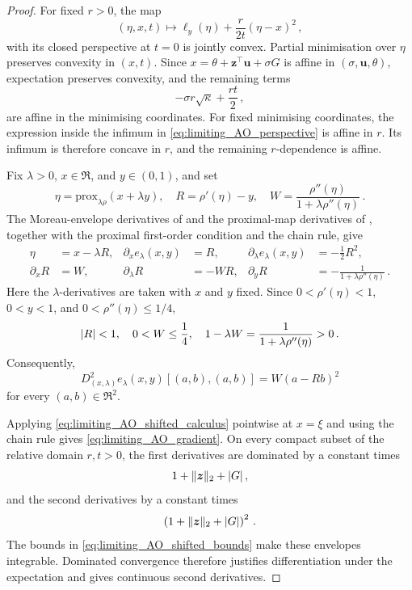 \documentclass{article}
\makeatletter
\theoremstyle{definition}
\newcommand{\vnorm}[1]{%
	\ensuremath{%
		\if@display
		\left\| #1 \right\|
		\else
		\| #1 \|
		\fi
	}%
}
\newcommand{\abs}[1]{%
	\ensuremath{%
		\if@display
		\left| #1 \right|
		\else
		\lvert #1 \rvert
		\fi
	}%
}
\newcommand*{\bb}{\boldsymbol}
\newcommand{\prox}[2]{\ensuremath{\textrm{prox}_{#1}\left(#2\right)}}
\def\bu{\bb{u}}
\def\bz{\bb{z}}
\makeatother
\begin{document}
\begin{bibunit}
\begin{proof}
For fixed $r>0$, the map
$$
    (\eta,x,t)
    \longmapsto
    \ell_y(\eta)+\frac{r}{2t}(\eta-x)^2\,,
$$
with its closed perspective at $t=0$ is jointly convex. Partial
minimisation over $\eta$ preserves convexity in $(x,t)$. Since
$x=\theta+\bz^\top\bu+\sigma G$ is affine in
$(\sigma,\bu,\theta)$, expectation preserves convexity, and the remaining
terms
$$
    -\sigma r\sqrt\kappa+\frac{rt}{2}\,,
$$
are affine in the minimising coordinates. For fixed minimising
coordinates, the expression inside the infimum in
\eqref{eq:limiting_AO_perspective} is affine in $r$. Its infimum is
therefore concave in $r$, and the remaining $r$-dependence is affine.

Fix $\lambda>0$, $x\in\Re$, and $y\in(0,1)$, and set
$$
    \eta
    =
    \prox{\lambda\rho}{x+\lambda y},
    \quad
    R
    =
    \rho'(\eta)-y,
    \quad
    W
    =
    \frac{\rho''(\eta)}
    {1+\lambda\rho''(\eta)}\,.
$$
The Moreau-envelope derivatives of
\citet[Lemma~2, equation~(29)]{salehi+et+al:2019} and the proximal-map
derivatives of
\citet[Proposition~6.3]{donoho+montanari:2016}, together with the
proximal first-order condition and the chain rule, give
\begin{equation}
\label{eq:limiting_AO_shifted_calculus}
\begin{aligned}
    \eta
    &=
    x-\lambda R,
    &
    \partial_xe_\lambda(x,y)
    &=
    R,
    &
    \partial_\lambda e_\lambda(x,y)
    &=
    -\frac12R^2,
    \\
    \partial_xR
    &=
    W,
    &
    \partial_\lambda R
    &=
    -WR,
    &
    \partial_yR
    &=
    -\frac{1}{1+\lambda\rho''(\eta)}\,.
\end{aligned}
\end{equation}
Here the $\lambda$-derivatives are taken with $x$ and $y$ fixed. Since
$0<\rho'(\eta)<1$, $0<y<1$, and $0<\rho''(\eta)\leq1/4$,
\begin{equation}
\label{eq:limiting_AO_shifted_bounds}
    \abs{R}<1,
    \quad
    0<W\leq\frac14,
    \quad
    1-\lambda W
    =
    \frac{1}{1+\lambda\rho''(\eta)}
    >
    0\,.
\end{equation}
Consequently,
\begin{equation}
\label{eq:limiting_AO_shifted_hessian}
    D^2_{(x,\lambda)}e_\lambda(x,y)[(a,b),(a,b)]
    =
    W(a-Rb)^2
\end{equation}
for every $(a,b)\in\Re^2$.

Applying \eqref{eq:limiting_AO_shifted_calculus} pointwise at $x=\xi$
and using the chain rule gives \eqref{eq:limiting_AO_gradient}. On every
compact subset of the relative domain $r,t>0$, the first derivatives are
dominated by a constant times
$$
    1+\vnorm{\bz}_2+\abs{G}\,,
$$
and the second derivatives by a constant times
$$
    \left(1+\vnorm{\bz}_2+\abs{G}\right)^2\,.
$$
The bounds in \eqref{eq:limiting_AO_shifted_bounds} make these envelopes
integrable. Dominated convergence therefore justifies differentiation
under the expectation and gives continuous second derivatives.


\end{proof}
\end{bibunit}
\end{document}
